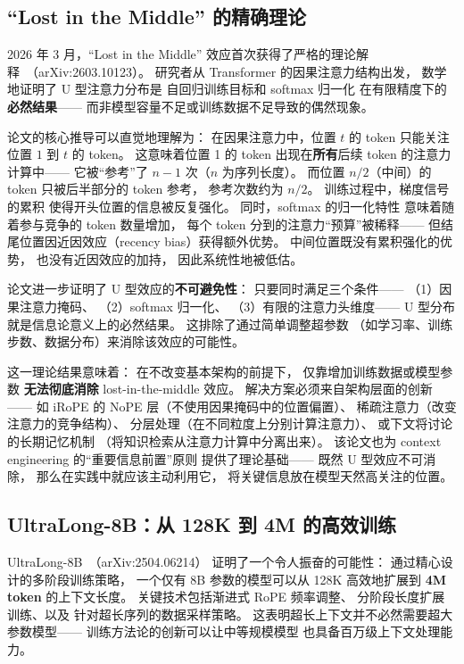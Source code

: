 \subsection{“Lost in the Middle” 的精确理论}

2026 年 3 月，“Lost in the Middle”
效应首次获得了严格的理论解释~\cite{lostmiddle2026}（arXiv:2603.10123）。
研究者从 Transformer 的因果注意力结构出发，
数学地证明了 U 型注意力分布是
自回归训练目标和 softmax 归一化
在有限精度下的\textbf{必然结果}——
而非模型容量不足或训练数据不足导致的偶然现象。

论文的核心推导可以直觉地理解为：
在因果注意力中，位置 $t$ 的 token
只能关注位置 $1$ 到 $t$ 的 token。
这意味着位置 1 的 token 出现在\textbf{所有}后续 token 的注意力计算中——
它被“参考”了 $n-1$ 次（$n$ 为序列长度）。
而位置 $n/2$（中间）的 token 只被后半部分的 token 参考，
参考次数约为 $n/2$。
训练过程中，梯度信号的累积
使得开头位置的信息被反复强化。
同时，softmax 的归一化特性
意味着随着参与竞争的 token 数量增加，
每个 token 分到的注意力“预算”被稀释——
但结尾位置因近因效应（recency bias）获得额外优势。
中间位置既没有累积强化的优势，
也没有近因效应的加持，
因此系统性地被低估。

论文进一步证明了 U 型效应的\textbf{不可避免性}：
只要同时满足三个条件——
（1）因果注意力掩码、
（2）softmax 归一化、
（3）有限的注意力头维度——
U 型分布就是信息论意义上的必然结果。
这排除了通过简单调整超参数
（如学习率、训练步数、数据分布）来消除该效应的可能性。

这一理论结果意味着：
在不改变基本架构的前提下，
仅靠增加训练数据或模型参数
\textbf{无法彻底消除} lost-in-the-middle 效应。
解决方案必须来自架构层面的创新——
如 iRoPE 的 NoPE 层（不使用因果掩码中的位置偏置）、
稀疏注意力（改变注意力的竞争结构）、
分层处理（在不同粒度上分别计算注意力）、
或下文将讨论的长期记忆机制
（将知识检索从注意力计算中分离出来）。
该论文也为 context engineering 的“重要信息前置”原则
提供了理论基础——
既然 U 型效应不可消除，
那么在实践中就应该主动利用它，
将关键信息放在模型天然高关注的位置。

\subsection{UltraLong-8B：从 128K 到 4M 的高效训练}

UltraLong-8B~\cite{ultralong2025}（arXiv:2504.06214）
证明了一个令人振奋的可能性：
通过精心设计的多阶段训练策略，
一个仅有 8B 参数的模型可以从 128K
高效地扩展到 \textbf{4M token} 的上下文长度。
关键技术包括渐进式 RoPE 频率调整、
分阶段长度扩展训练、以及
针对超长序列的数据采样策略。
这表明超长上下文并不必然需要超大参数模型——
训练方法论的创新可以让中等规模模型
也具备百万级上下文处理能力。

